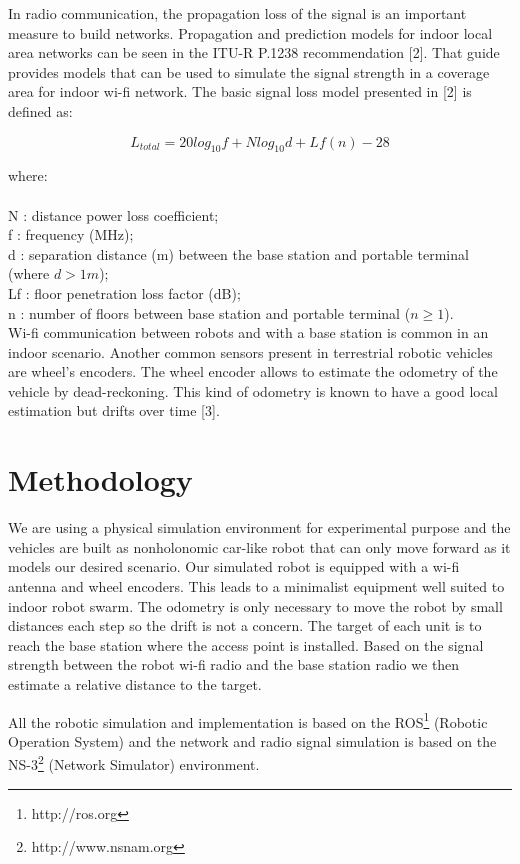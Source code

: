 \documentclass[11pt,a4paper,oneside,twocolumn]{article}
\begin{document}
In radio communication, the propagation loss of the signal is an important
measure to build networks. Propagation and prediction models for indoor local
area networks can be seen in the ITU-R P.1238 recommendation [2]. That guide
provides models that can be used to simulate the signal strength in a coverage
area for indoor wi-fi network. The basic signal loss model presented in [2] is
defined as:

\[L_{total}=20 log_{10}f + N log_{10}d + Lf(n) - 28\]

where:\\
\\
N : distance power loss coefficient;\\
f : frequency (MHz);\\
d : separation distance (m) between the base station and portable terminal (where $d > 1m$);\\
Lf : floor penetration loss factor (dB);\\
n : number of floors between base station and portable terminal ($n \geq 1$).\\


Wi-fi communication between robots and with a base station is common in an
indoor scenario. Another common sensors present in terrestrial robotic
vehicles are wheel's encoders. The wheel encoder allows to estimate the odometry
of the vehicle by dead-reckoning. This kind of odometry is known to have a good
local estimation but drifts over time [3].

\section{Methodology}

We are using a physical simulation environment for experimental purpose and the
vehicles are built as nonholonomic car-like robot that can only move forward as
it models our desired scenario. Our simulated robot is equipped with a wi-fi
antenna and wheel encoders. This leads to a minimalist equipment well suited to
indoor robot swarm. The odometry is only necessary to move the robot by small
distances each step so the drift is not a concern. The target of each unit is to
reach the base station where the access point is installed. Based on the signal
strength between the robot wi-fi radio and the base station radio we then
estimate a relative distance to the target.

All the robotic simulation and implementation is based on the
ROS\footnote{http://ros.org} (Robotic Operation System) and the network and
radio signal simulation is based on the NS-3\footnote{http://www.nsnam.org}
(Network Simulator) environment.
\end{document}
